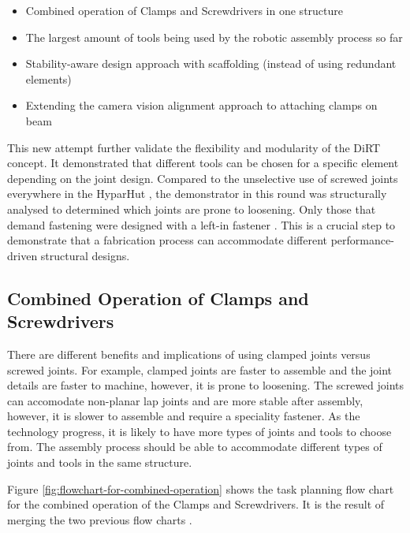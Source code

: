 \begin{itemize}
	\item Combined operation of Clamps and Screwdrivers in one structure
	\item The largest amount of tools being used by the robotic assembly process so far
	\item Stability-aware design approach with scaffolding (instead of using redundant elements)
	\item Extending the camera vision alignment approach to attaching clamps on beam
\end{itemize}

This new attempt further validate the flexibility and modularity of the DiRT concept. It demonstrated that different tools can be chosen for a specific element depending on the joint design.%
Compared to the unselective use of screwed joints everywhere in the HyparHut , the demonstrator in this round was structurally analysed to determined which joints are prone to loosening.
Only those that demand fastening were designed with a left-in fastener . This is a crucial step to demonstrate that a fabrication process can accommodate different performance-driven structural designs.

\subsection{Combined Operation of Clamps and Screwdrivers}
\label{subsection:exploration-5-combined-operation-of-clamps-and-screwdrivers}

There are different benefits and implications of using clamped joints versus screwed joints. For example, clamped joints are faster to assemble and the joint details are faster to machine, however, it is prone to loosening. The screwed joints can accomodate non-planar lap joints and are more stable after assembly, however, it is slower to assemble and require a speciality fastener. As the technology progress, it is likely to have more types of joints and tools to choose from. The assembly process should be able to accommodate different types of joints and tools in the same structure.

Figure \ref{fig:flowchart-for-combined-operation} shows the task planning flow chart for the combined operation of the Clamps and Screwdrivers. It is the result of merging the two previous flow charts .

